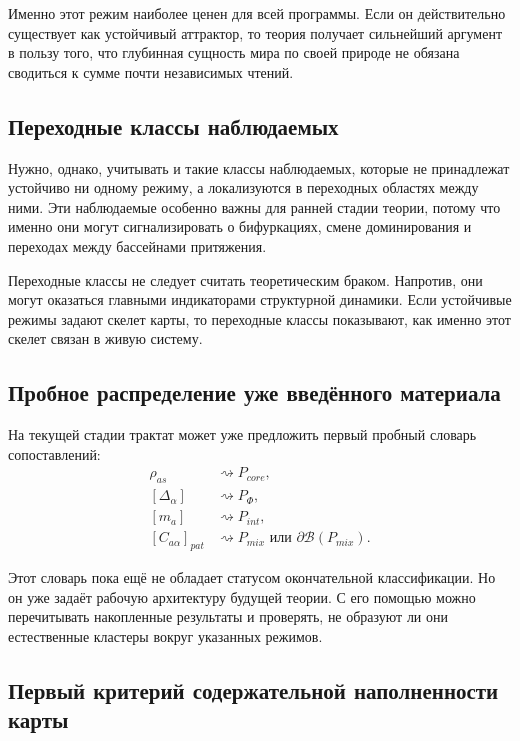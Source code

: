 \documentclass[12pt,a4paper]{article}
\begin{document}
Именно этот режим наиболее ценен для всей программы. Если он действительно существует как устойчивый аттрактор, то теория получает сильнейший аргумент в пользу того, что глубинная сущность мира по своей природе не обязана сводиться к сумме почти независимых чтений.

\subsection{Переходные классы наблюдаемых}

Нужно, однако, учитывать и такие классы наблюдаемых, которые не принадлежат устойчиво ни одному режиму, а локализуются в переходных областях между ними. Эти наблюдаемые особенно важны для ранней стадии теории, потому что именно они могут сигнализировать о бифуркациях, смене доминирования и переходах между бассейнами притяжения.

Переходные классы не следует считать теоретическим браком. Напротив, они могут оказаться главными индикаторами структурной динамики. Если устойчивые режимы задают скелет карты, то переходные классы показывают, как именно этот скелет связан в живую систему.

\subsection{Пробное распределение уже введённого материала}

На текущей стадии трактат может уже предложить первый пробный словарь сопоставлений:
\begin{align}
\rho_{as} &\rightsquigarrow P_{core}, \\
[\Delta_{\alpha}] &\rightsquigarrow P_{\Phi}, \\
[m_a] &\rightsquigarrow P_{int}, \\
[C_{a\alpha}]_{pat} &\rightsquigarrow P_{mix} \text{ или } \partial \mathcal{B}(P_{mix}).
\end{align}

Этот словарь пока ещё не обладает статусом окончательной классификации. Но он уже задаёт рабочую архитектуру будущей теории. С его помощью можно перечитывать накопленные результаты и проверять, не образуют ли они естественные кластеры вокруг указанных режимов.

\subsection{Первый критерий содержательной наполненности карты}
\end{document}
